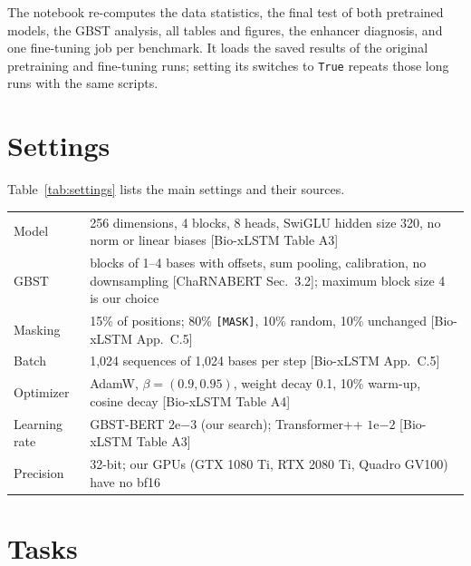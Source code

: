 \documentclass{article}
\begin{document}
The notebook re-computes the data statistics, the final test of both pretrained models, the GBST
analysis, all tables and figures, the enhancer diagnosis, and one fine-tuning job per benchmark. It
loads the saved results of the original pretraining and fine-tuning runs; setting its switches
to \texttt{True} repeats those long runs with the same scripts.




\clearpage
\appendix

\section{Settings}\label{app:hparams}

Table~\ref{tab:settings} lists the main settings and their sources.

\begin{center}
  \small
  \label{tab:settings}
  \begin{tabularx}{\linewidth}{lX}
    \toprule
    Model & 256 dimensions, 4 blocks, 8 heads, SwiGLU hidden size 320, no norm or linear biases [Bio-xLSTM Table A3] \\
    GBST & blocks of 1--4 bases with offsets, sum pooling, calibration, no downsampling [ChaRNABERT Sec.~3.2]; maximum block size 4 is our choice \\
    Masking & 15\% of positions; 80\% \texttt{[MASK]}, 10\% random, 10\% unchanged [Bio-xLSTM App.~C.5] \\
    Batch & 1,024 sequences of 1,024 bases per step [Bio-xLSTM App.~C.5] \\
    Optimizer & AdamW, $\beta=(0.9,0.95)$, weight decay 0.1, 10\% warm-up, cosine decay [Bio-xLSTM Table A4] \\
    Learning rate & GBST-BERT $2\mathrm{e}{-3}$ (our search); Transformer++ $1\mathrm{e}{-2}$ [Bio-xLSTM Table A3] \\
    Precision & 32-bit; our GPUs (GTX 1080 Ti, RTX 2080 Ti, Quadro GV100) have no bf16 \\
    \bottomrule
  \end{tabularx}
\end{center}

\section{Tasks}\label{app:tasks}

\begin{center}
  \small
  \resizebox{\linewidth}{!}{}
\end{center}
\end{document}

